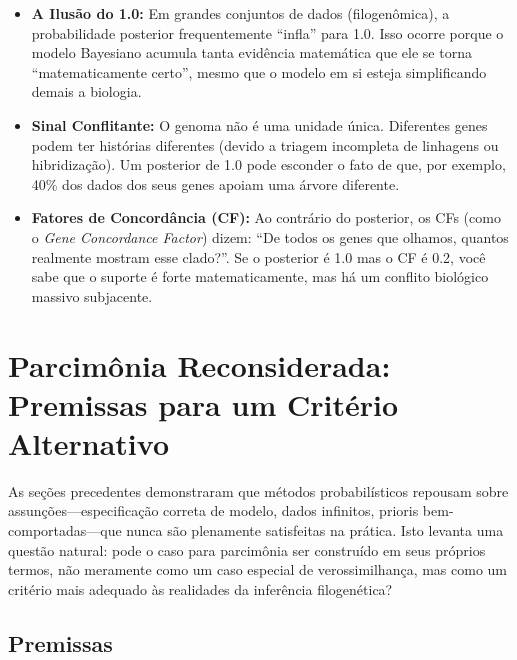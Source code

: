 \begin{tcolorbox}[
    colback=green!5!white, 
    colframe=green!50!black, 
    title=\textbf{Posterior 1.0 vs. Realidade Biológica},
    arc=2mm
]
\begin{itemize}
    \item \textbf{A Ilusão do 1.0:} Em grandes conjuntos de dados (filogenômica), a probabilidade posterior frequentemente ``infla'' para 1.0. Isso ocorre porque o modelo Bayesiano acumula tanta evidência matemática que ele se torna ``matematicamente certo'', mesmo que o modelo em si esteja simplificando demais a biologia.
    \item \textbf{Sinal Conflitante:} O genoma não é uma unidade única. Diferentes genes podem ter histórias diferentes (devido a triagem incompleta de linhagens ou hibridização). Um posterior de 1.0 pode esconder o fato de que, por exemplo, 40\% dos dados dos seus genes apoiam uma árvore diferente.
    \item \textbf{Fatores de Concordância (CF):} Ao contrário do posterior, os CFs (como o \textit{Gene Concordance Factor}) dizem: ``De todos os genes que olhamos, quantos realmente mostram esse clado?''. Se o posterior é 1.0 mas o CF é 0.2, você sabe que o suporte é forte matematicamente, mas há um conflito biológico massivo subjacente.
\end{itemize}
\end{tcolorbox}

\section{Parcimônia Reconsiderada: Premissas para um Critério Alternativo}

As seções precedentes demonstraram que métodos probabilísticos repousam sobre assunções---especificação correta de modelo, dados infinitos, prioris bem-comportadas---que nunca são plenamente satisfeitas na prática. Isto levanta uma questão natural: pode o caso para parcimônia ser construído em seus próprios termos, não meramente como um caso especial de verossimilhança, mas como um critério mais adequado às realidades da inferência filogenética?

\subsection{Premissas}

